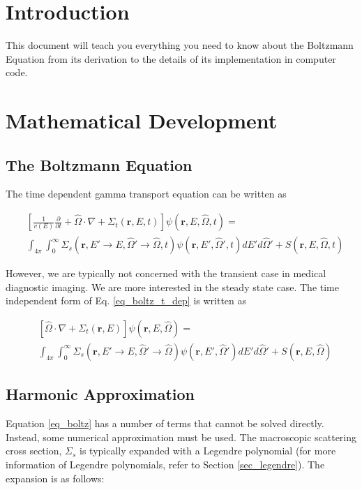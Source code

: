\documentclass{article}
\numberwithin{equation}{subsection}
\begin{document}
\section{Introduction}
This document will teach you everything you need to know about the Boltzmann Equation from its derivation to the details of its implementation in computer code.

\section{Mathematical Development}

\subsection{The Boltzmann Equation}

The time dependent gamma transport equation can be written as

\begin{equation} \label{eq_boltz_t_dep}
\begin{split}
	&\left[ \frac{1}{v(E)} \frac{\partial}{\partial t} + \hat{\Omega} \cdot \nabla + \Sigma_t(\boldsymbol{r}, E, t) \right]
	\psi(\boldsymbol{r}, E, \hat{\Omega}, t) = \\
	&\int_{4 \pi} \int_0^\infty \Sigma_s(\boldsymbol{r}, E' \rightarrow E, \hat{\Omega}' \rightarrow \hat{\Omega}, t) \psi(\boldsymbol{r}, E', \hat{\Omega}', t) dE' d\hat{\Omega}' + S(\boldsymbol{r}, E, \hat{\Omega}, t)
\end{split}
\end{equation}

However, we are typically not concerned with the transient case in medical diagnostic imaging. We are more interested in the steady state case. The time independent form of Eq. \ref{eq_boltz_t_dep} is written as

\begin{equation} \label{eq_boltz}
\begin{split}
	&\left[ \hat{\Omega} \cdot \nabla + \Sigma_t(\boldsymbol{r}, E) \right]
	\psi(\boldsymbol{r}, E, \hat{\Omega}) = \\
	&\int_{4 \pi} \int_0^\infty \Sigma_s(\boldsymbol{r}, E' \rightarrow E, \hat{\Omega}' \rightarrow \hat{\Omega}) \psi(\boldsymbol{r}, E', \hat{\Omega}') dE' d\hat{\Omega}' + S(\boldsymbol{r}, E, \hat{\Omega})
\end{split}
\end{equation}

\subsection{Harmonic Approximation}
Equation \ref{eq_boltz} has a number of terms that cannot be solved directly. Instead, some numerical approximation must be used. The macroscopic scattering cross section, $\Sigma_s$ is typically expanded with a Legendre polynomial (for more information of Legendre polynomials, refer to Section \ref{sec_legendre}). The expansion is as follows:
\end{document}
